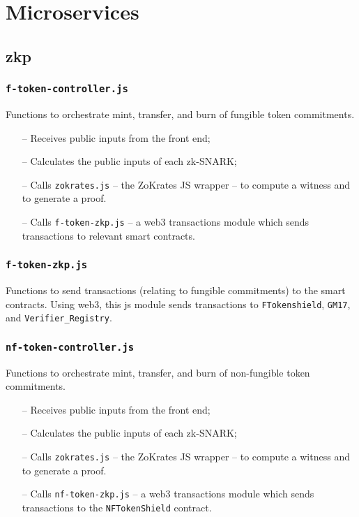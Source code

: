 \section{Microservices}
\label{sec:microservices}
\secttoc

\subsection{zkp}
\label{sec:zkp}

\subsubsection{\texttt{f-token-controller.js}}
\label{sec:f-token-controller}
Functions to orchestrate mint, transfer, and burn of fungible token commitments.
\begin{itemize}
  \item[--] Receives public inputs from the front end;
  \item[--] Calculates the public inputs of each zk-SNARK;
  \item[--] Calls \texttt{zokrates.js} -- the ZoKrates JS wrapper -- to compute a witness and to generate a proof.
  \item[--] Calls \texttt{f-token-zkp.js} -- a web3 transactions module which sends transactions to relevant smart contracts.
\end{itemize} 

\subsubsection{\texttt{f-token-zkp.js}}
\label{sec:f-token-zkp}
Functions to send transactions (relating to fungible commitments) to the smart contracts. Using web3, this js module sends transactions to \texttt{FTokenshield}, \texttt{GM17}, and \texttt{Verifier\_Registry}.

\subsubsection{\texttt{nf-token-controller.js}}
\label{sec:nf-token-controller}
Functions to orchestrate mint, transfer, and burn of non-fungible token commitments.
\begin{itemize}
  \item[--] Receives public inputs from the front end;
  \item[--] Calculates the public inputs of each zk-SNARK;
  \item[--] Calls \texttt{zokrates.js} -- the ZoKrates JS wrapper -- to compute a witness and to generate a proof.
  \item[--] Calls \texttt{nf-token-zkp.js} -- a web3 transactions module which sends transactions to the \texttt{NFTokenShield} contract.
\end{itemize}

